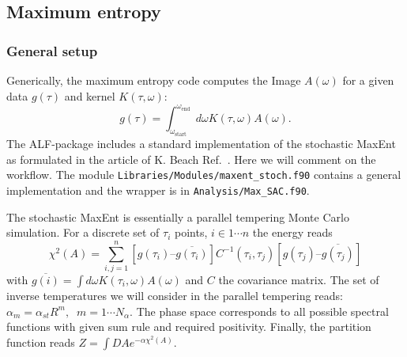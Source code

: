 

\subsection{Maximum entropy }

\subsubsection{General setup}
Generically, the maximum entropy code computes the  Image  $A(\omega) $ for a given  data $g(\tau) $  and kernel $K(\tau,\omega) $:
\begin{equation}
g(\tau) =  \int_{\omega_\text{start}}^{\omega_\text{end}} d {\omega} K(\tau,\omega) A(\omega).
\end{equation} 
The  ALF-package includes a standard implementation of the stochastic MaxEnt as formulated in the article of K. Beach Ref.~\cite{Beach04a}. Here we will comment on the workflow.  The module 
\texttt{Libraries/Modules/\allowbreak{}maxent\_stoch.f90} contains a general implementation and the wrapper is in \texttt{Analysis/Max\_SAC.f90}. 

The stochastic MaxEnt is essentially a parallel tempering Monte Carlo simulation.    For a discrete set of $\tau_i$ points,  $i \in 1 \cdots n $ the energy reads
\begin{equation}
  \chi^{2}(A) =  \sum_{i,j=1}^{n}   \left[ g(\tau_i)  –    \overline{g(\tau_i)} \right] C^{-1}(\tau_i,\tau_j) \left[    g(\tau_j)  –  \overline{g(\tau_j)} \right] 
\end{equation} with $ \overline{g(i)} =\int d{\omega} K(\tau_{i},\omega)  A(\omega)$ and  $C$ the covariance matrix. 
The set  of inverse temperatures  we will consider  in the parallel tempering reads:
$ \alpha_m = \alpha_{st}  R^{m}, \; \; m = 1 \cdots N_{\alpha} $.   The phase space corresponds to all possible spectral functions with given sum rule and required positivity.  Finally,  the partition function reads
$Z =  \int{DA} e^{-\alpha \chi^{2}(A)}$.  

